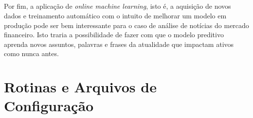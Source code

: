 \documentclass[grad,numbers]{coppe}
\begin{document}
 			\paragraph{}Por fim, a aplicação de \textit{online machine learning}, isto é, a aquisição de novos dados e treinamento automático com o intuito de melhorar um modelo em produção pode ser bem interessante para o caso de análise de notícias do mercado financeiro. Isto traria a possibilidade de fazer com que o modelo preditivo aprenda novos assuntos, palavras e frases da atualidade que impactam ativos como nunca antes.

  \backmatter
  
  

  \appendix	

	\chapter{Rotinas e Arquivos de Configuração}
\end{document}

